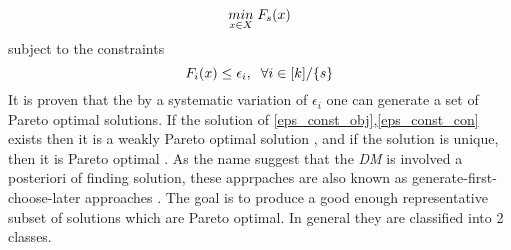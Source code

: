 \begin{equation}\label{eps_const_obj}
    \underset{x \in X}{min}\hspace{1mm} F_s(x)
\end{equation}
\newline subject to the constraints
\begin{equation}\label{eps_const_con}
    F_i(x) \le \epsilon_i,\hspace{2mm} \forall i \in [k]/\{s\}
\end{equation}\newline
It is proven that the by a systematic variation of $\epsilon_i$ one can generate a set of Pareto optimal solutions\cite{hwang1979methods}.
If the solution of \ref{eps_const_obj},\ref{eps_const_con} exists then it is a weakly Pareto optimal solution \cite{miettinen2012nonlinear}, and if the solution is unique, then it is Pareto optimal \cite{miettinen2012nonlinear}.
 \label{a_posteriori_method}
As the name suggest that the \textit{DM} is involved a posteriori of finding solution, these apprpaches are also known as generate-first-choose-later approaches \cite{messac2002generating}. The goal is to produce a good enough representative subset of solutions which are Pareto optimal. In general they are classified into 2 classes.

